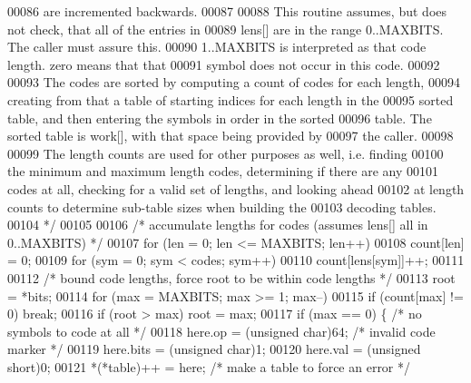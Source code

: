 \begin{DoxyCode}
00086 \textcolor{comment}{       are incremented backwards.}
00087 \textcolor{comment}{}
00088 \textcolor{comment}{       This routine assumes, but does not check, that all of the entries in}
00089 \textcolor{comment}{       lens[] are in the range 0..MAXBITS.  The caller must assure this.}
00090 \textcolor{comment}{       1..MAXBITS is interpreted as that code length.  zero means that that}
00091 \textcolor{comment}{       symbol does not occur in this code.}
00092 \textcolor{comment}{}
00093 \textcolor{comment}{       The codes are sorted by computing a count of codes for each length,}
00094 \textcolor{comment}{       creating from that a table of starting indices for each length in the}
00095 \textcolor{comment}{       sorted table, and then entering the symbols in order in the sorted}
00096 \textcolor{comment}{       table.  The sorted table is work[], with that space being provided by}
00097 \textcolor{comment}{       the caller.}
00098 \textcolor{comment}{}
00099 \textcolor{comment}{       The length counts are used for other purposes as well, i.e. finding}
00100 \textcolor{comment}{       the minimum and maximum length codes, determining if there are any}
00101 \textcolor{comment}{       codes at all, checking for a valid set of lengths, and looking ahead}
00102 \textcolor{comment}{       at length counts to determine sub-table sizes when building the}
00103 \textcolor{comment}{       decoding tables.}
00104 \textcolor{comment}{     */}
00105 
00106     \textcolor{comment}{/* accumulate lengths for codes (assumes lens[] all in 0..MAXBITS) */}
00107     \textcolor{keywordflow}{for} (len = 0; len <= MAXBITS; len++)
00108         count[len] = 0;
00109     \textcolor{keywordflow}{for} (sym = 0; sym < codes; sym++)
00110         count[lens[sym]]++;
00111 
00112     \textcolor{comment}{/* bound code lengths, force root to be within code lengths */}
00113     root = *bits;
00114     \textcolor{keywordflow}{for} (max = MAXBITS; max >= 1; max--)
00115         \textcolor{keywordflow}{if} (count[max] != 0) \textcolor{keywordflow}{break};
00116     \textcolor{keywordflow}{if} (root > max) root = max;
00117     \textcolor{keywordflow}{if} (max == 0) \{                     \textcolor{comment}{/* no symbols to code at all */}
00118         here.op = (\textcolor{keywordtype}{unsigned} char)64;    \textcolor{comment}{/* invalid code marker */}
00119         here.bits = (\textcolor{keywordtype}{unsigned} char)1;
00120         here.val = (\textcolor{keywordtype}{unsigned} short)0;
00121         *(*table)++ = here;             \textcolor{comment}{/* make a table to force an error */}

\end{DoxyCode}
